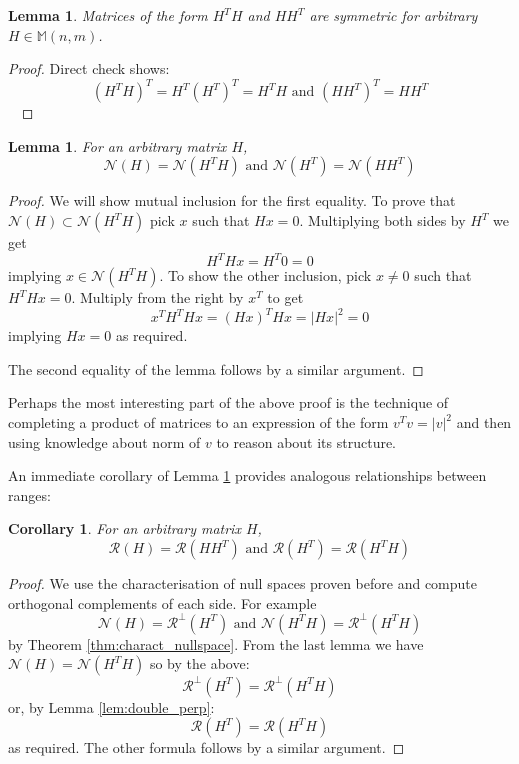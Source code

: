 \documentclass[a4paper,11pt]{article}
\theoremstyle{break}
\newtheorem{corollary}{Corollary}[theorem]
\newtheorem{lemma}[theorem]{Lemma}
\newcommand{\Nu}{\mathcal{N}}
\newcommand{\Ra}{\mathcal{R}}
\newcommand{\Mat}[2]{\mathbb{M}(#1, #2)}
\begin{document}
\begin{lemma}
Matrices of the form $H^T H$ and $H H^T$ are symmetric for arbitrary $H \in \Mat{n}{m}$.
\end{lemma}
\begin{proof}
    Direct check shows:
    $$(H^T H)^T = H^T (H^T)^T = H^T H \text{ and } (H H^T)^T = H H^T$$~
\end{proof}

\begin{lemma}
    \label{lem:nullspaces_hht}
    For an arbitrary matrix $H$,
    $$\Nu(H) = \Nu(H^T H) \text{ and } \Nu(H^T) = \Nu(H H^T)$$
\end{lemma}

\begin{proof}
    We will show mutual inclusion for the first equality. To prove that $\Nu(H) \subset \Nu(H^T H)$ pick $x$ such that $H x = 0$. Multiplying both sides by $H^T$ we get
    $$ H^T H x = H^T 0 = 0 $$
    implying $x \in \Nu(H^T H) $.
    To show the other inclusion, pick $x \neq 0$ such that $H^T H x = 0$. Multiply from the right by $x^T$ to get
    $$ x^T H^T H x = (H x)^T H x = | H x |^2 = 0 $$
    implying $ H x =0 $ as required.
    
    The second equality of the lemma follows by a similar argument.
\end{proof}

Perhaps the most interesting part of the above proof is the technique of completing a product of matrices to an expression of the form $v^T v = | v |^2 $ and then using knowledge about norm of $v$ to reason about its structure.

An immediate corollary of Lemma \ref{lem:nullspaces_hht} provides analogous relationships between ranges:

\begin{corollary}\label{cor:equal_ranges}
    For an arbitrary matrix $H$,
    $$\Ra(H) = \Ra(H H^T) \text{ and } \Ra(H^T) = \Ra(H^T H)$$
\end{corollary}

\begin{proof}
    We use the characterisation of null spaces proven before and compute orthogonal complements of each side. For example
    $$ \Nu(H) = \Ra^\perp (H^T) \text{ and } \Nu(H^T H) = \Ra^\perp ( H^T H )$$
    by Theorem \ref{thm:charact_nullspace}. From the last lemma we have
    $ \Nu(H) = \Nu(H^T H) $ so by the above:
    $$ \Ra^\perp (H^T) = \Ra^\perp ( H^T H ) $$
    or, by Lemma \ref{lem:double_perp}:
    $$ \Ra (H^T) = \Ra( H^T H ) $$
    as required. The other formula follows by a similar argument.
\end{proof}
\end{document}
